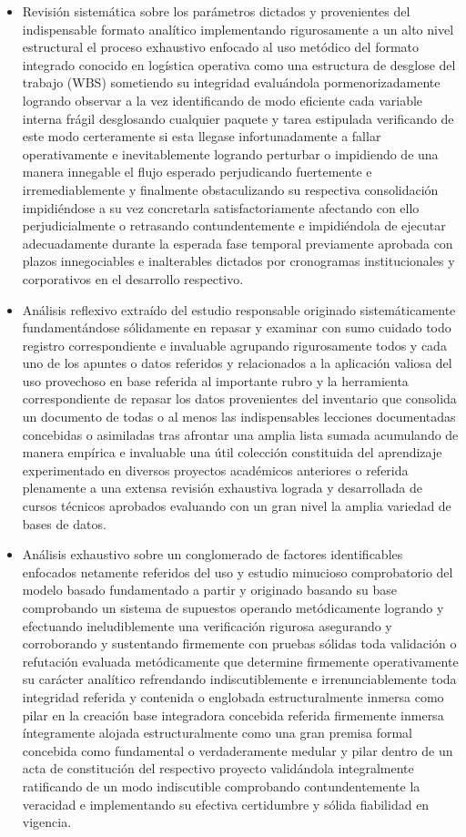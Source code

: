 \documentclass[11pt,spanish]{article}
\begin{document}
\begin{itemize}
    \item Revisión sistemática sobre los parámetros dictados y provenientes del indispensable formato analítico implementando rigurosamente a un alto nivel estructural el proceso exhaustivo enfocado al uso metódico del formato integrado conocido en logística operativa como una estructura de desglose del trabajo (WBS) sometiendo su integridad evaluándola pormenorizadamente logrando observar a la vez identificando de modo eficiente cada variable interna frágil desglosando cualquier paquete y tarea estipulada verificando de este modo certeramente si esta llegase infortunadamente a fallar operativamente e inevitablemente logrando perturbar o impidiendo de una manera innegable el flujo esperado perjudicando fuertemente e irremediablemente y finalmente obstaculizando su respectiva consolidación impidiéndose a su vez concretarla satisfactoriamente afectando con ello perjudicialmente o retrasando contundentemente e impidiéndola de ejecutar adecuadamente durante la esperada fase temporal previamente aprobada con plazos innegociables e inalterables dictados por cronogramas institucionales y corporativos en el desarrollo respectivo.
    \item Análisis reflexivo extraído del estudio responsable originado sistemáticamente fundamentándose sólidamente en repasar y examinar con sumo cuidado todo registro correspondiente e invaluable agrupando rigurosamente todos y cada uno de los apuntes o datos referidos y relacionados a la aplicación valiosa del uso provechoso en base referida al importante rubro y la herramienta correspondiente de repasar los datos provenientes del inventario que consolida un documento de todas o al menos las indispensables lecciones documentadas concebidas o asimiladas tras afrontar una amplia lista sumada acumulando de manera empírica e invaluable una útil colección constituida del aprendizaje experimentado en diversos proyectos académicos anteriores o referida plenamente a una extensa revisión exhaustiva lograda y desarrollada de cursos técnicos aprobados evaluando con un gran nivel la amplia variedad de bases de datos.
    \item Análisis exhaustivo sobre un conglomerado de factores identificables enfocados netamente referidos del uso y estudio minucioso comprobatorio del modelo basado fundamentado a partir y originado basando su base comprobando un sistema de supuestos operando metódicamente logrando y efectuando ineludiblemente una verificación rigurosa asegurando y corroborando y sustentando firmemente con pruebas sólidas toda validación o refutación evaluada metódicamente que determine firmemente operativamente su carácter analítico refrendando indiscutiblemente e irrenunciablemente toda integridad referida y contenida o englobada estructuralmente inmersa como pilar en la creación base integradora concebida referida firmemente inmersa íntegramente alojada estructuralmente como una gran premisa formal concebida como fundamental o verdaderamente medular y pilar dentro de un acta de constitución del respectivo proyecto validándola integralmente ratificando de un modo indiscutible comprobando contundentemente la veracidad e implementando su efectiva certidumbre y sólida fiabilidad en vigencia.

\end{itemize}
\end{document}
